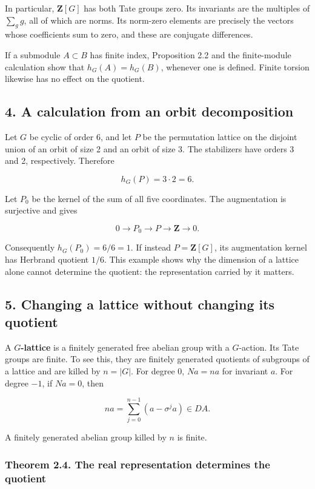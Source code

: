 \documentclass[11pt,a4paper]{article}
\begin{document}
In particular, \(\mathbf Z[G]\) has both Tate groups zero. Its
invariants are the multiples of \(\sum_g g\), all of which are norms.
Its norm-zero elements are precisely the vectors whose coefficients sum
to zero, and these are conjugate differences.

If a submodule \(A\subset B\) has finite index, Proposition 2.2 and the
finite-module calculation show that \(h_G(A)=h_G(B)\), whenever one is
defined. Finite torsion likewise has no effect on the quotient.

\subsection{4. A calculation from an orbit
decomposition}\label{a-calculation-from-an-orbit-decomposition}

Let \(G\) be cyclic of order 6, and let \(P\) be the permutation lattice
on the disjoint union of an orbit of size 2 and an orbit of size 3. The
stabilizers have orders 3 and 2, respectively. Therefore

\[
h_G(P)=3\cdot2=6.
\]

Let \(P_0\) be the kernel of the sum of all five coordinates. The
augmentation is surjective and gives

\[
0\longrightarrow P_0\longrightarrow P\longrightarrow\mathbf Z\longrightarrow0.
\]

Consequently \(h_G(P_0)=6/6=1\). If instead \(P=\mathbf Z[G]\), its
augmentation kernel has Herbrand quotient \(1/6\). This example shows
why the dimension of a lattice alone cannot determine the quotient: the
representation carried by it matters.

\subsection{5. Changing a lattice without changing its
quotient}\label{changing-a-lattice-without-changing-its-quotient}

A \textbf{\(G\)-lattice} is a finitely generated free abelian group with
a \(G\)-action. Its Tate groups are finite. To see this, they are
finitely generated quotients of subgroups of a lattice and are killed by
\(n=|G|\). For degree 0, \(Na=na\) for invariant \(a\). For degree
\(-1\), if \(Na=0\), then

\[
na=\sum_{j=0}^{n-1}(a-\sigma^j a)\in DA.
\]

A finitely generated abelian group killed by \(n\) is finite.

\subsubsection{Theorem 2.4. The real representation determines the
quotient}\label{theorem-2.4.-the-real-representation-determines-the-quotient}
\end{document}
